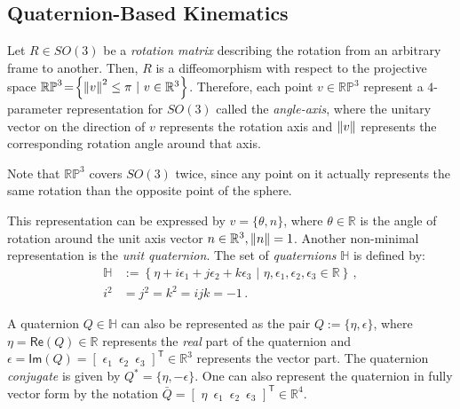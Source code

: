 \subsection{Quaternion-Based Kinematics}

Let $R \in SO(3)$ be a \textit{rotation matrix} describing the rotation from an arbitrary frame to another.
%
Then, $R$ is a diffeomorphism with respect to the projective space $\mathbb{RP}^{3} \!=\! \left\{ \left\lVert v\right\rVert^2 \leq \pi \,\,|\,\, v \in \mathbb{R}^3 \right\}$.
Therefore, each point $v \in \mathbb{RP}^{3}$ represent a $4$-parameter representation for $SO(3)$ called the \textit{angle-axis}, where the unitary vector on the direction of $v$ represents the rotation axis and $\left\lVert v\right\rVert$ represents the corresponding rotation angle around that axis.
%
\begin{remark}
Note that $\mathbb{RP}^{3}$ covers $SO(3)$ twice, since any point on it actually represents the same rotation than the opposite point of the sphere.
\end{remark}
%
This representation can be expressed by $v = \{\theta,n\}$, where $\theta \in \mathbb{R}$ is the angle of rotation around the unit axis vector $n \in \mathbb{R}^{3}, \left\lVert n\right\rVert = 1$.
%
Another non-minimal representation is the \textit{unit quaternion}. The set of \textit{quaternions} $\mathbb{H}$ is defined by:
%
\begin{align}
\mathbb{H} &:= \left\{ \eta + i \epsilon_{1} + j \epsilon_{2} + k \epsilon_{3} \,\,|\,\, \eta,\epsilon_{1},\epsilon_{2},\epsilon_{3} \in \mathbb{R} \right\} \,, \nonumber \\
i^2 &= j^2 = k^2 = ijk = -1 \,.
\label{eq:def_quaternion}
\end{align}

A quaternion $Q \in \mathbb{H}$ can also be represented as the pair $Q := \{\eta,\epsilon\}$, where 
$\eta = \mathsf{Re}(Q) \in \mathbb{R}$ represents the \textit{real} part of the quaternion and $\epsilon = \mathsf{Im}(Q) = [\,\, \epsilon_{1} \,\,\, \epsilon_{2} \,\,\, \epsilon_{3} \,\,]^\mathsf{T} \in \mathbb{R}^{3}$ represents the vector part.
%
The quaternion \textit{conjugate} is given by $Q^* = \{\eta,-\epsilon\}$.
%
One can also represent the quaternion in fully vector form by the notation 
$\bar{Q} = [\,\, \eta \,\,\, \epsilon_{1} \,\,\, \epsilon_{2} \,\,\, \epsilon_{3} \,\,]^\mathsf{T} \in \mathbb{R}^4$.

